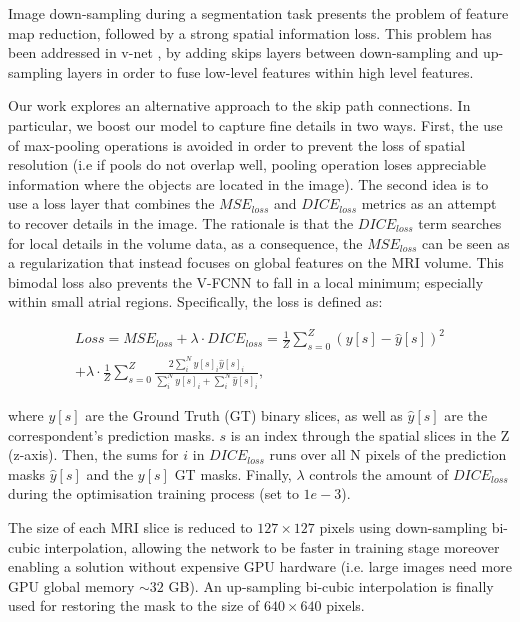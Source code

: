 \documentclass{llncs}
\begin{document}
Image down-sampling during a segmentation task
presents the problem of feature map reduction, followed by a strong spatial information loss.
This problem has been addressed in v-net \cite{Fausto}, \cite{Isensee} by adding skips layers between down-sampling and up-sampling layers
in order to fuse low-level features within high level
features.

Our work explores an alternative approach to the skip path connections. In particular, we boost our model to capture fine details in two ways.
First, the use of max-pooling operations is avoided in order to prevent the loss of spatial resolution (i.e if pools do not overlap well, pooling operation loses appreciable information where the objects are located in the image). The second idea is to use a loss layer that combines the $MSE_{loss}$ and $DICE_{loss}$ metrics as an attempt to recover details in the image. The rationale is that the $DICE_{loss}$ term searches for local details in the volume data, as a consequence, the $MSE_{loss}$ can be seen as a regularization that instead focuses on global features on the MRI volume. This bimodal loss also prevents the V-FCNN to fall in a local minimum; especially within small atrial regions. Specifically, the loss is defined as:

\begin{equation}
\begin{split}
 Loss =  MSE_{loss} + \lambda\cdot DICE_{loss} =  \frac{1}{Z} \sum_{s=0}^{Z} (y[s]-\hat{y}[s])^{2} \\
  + \lambda\cdot  \frac{1}{Z} \sum_{s=0}^{Z} \frac{2\sum_{i}^{N} y[s]_{i}\hat{y}[s]_{i}}{\sum_{i}^{N} y[s]_{i} + \sum_{i}^{N} \hat{y}[s]_{i}},
\end{split}
\end{equation}

where $y[s]$ are the Ground Truth (GT) binary slices, as well as $\hat{y}[s]$ are the correspondent's prediction masks. $s$ is an index through the spatial slices in the Z (z-axis).
Then, the sums for $i$ in $DICE_{loss}$ runs over all N pixels of the prediction masks $\hat{y}[s]$ and the $y[s]$ GT masks. Finally, $\lambda$ controls the amount of $DICE_{loss}$ during the optimisation training process (set to $1e-3$).

The size of each MRI slice is reduced to $127\times127$ pixels using down-sampling bi-cubic interpolation, allowing the network to be faster in training stage moreover enabling a solution without expensive GPU hardware (i.e. large images need more GPU global memory $\sim 32$ GB). An up-sampling bi-cubic interpolation is finally used for restoring the mask to the size of $640\times640$ pixels.
\end{document}
